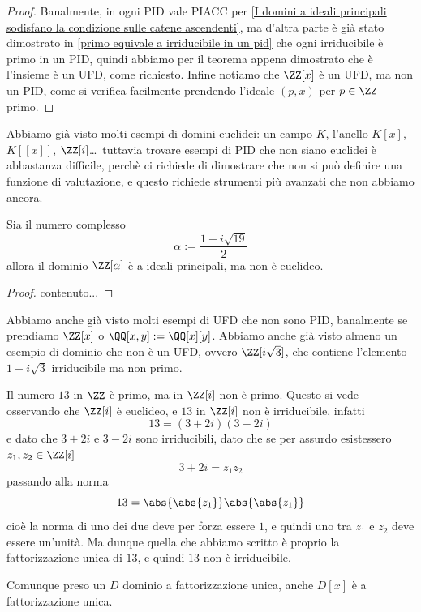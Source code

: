 \documentclass[11pt]{scrartcl}
\begin{document}
	\begin{proof}
		Banalmente, in ogni PID vale PIACC per \ref{I domini a ideali principali sodisfano la condizione sulle catene ascendenti}, ma d'altra parte è già stato dimostrato in \ref{primo equivale a irriducibile in un pid} che ogni irriducibile è primo in un PID, quindi abbiamo per il teorema appena dimostrato che è l'insieme è un UFD, come richiesto. Infine notiamo che $\ZZ[x]$ è un UFD, ma non un PID, come si verifica facilmente prendendo l'ideale $(p,x)$ per $p\in \ZZ$ primo.
	\end{proof}
	Abbiamo già visto molti esempi di domini euclidei: un campo $K$, l'anello $K[x]$, $K[[x]]$, $\ZZ[i]$\dots\, tuttavia trovare esempi di PID che non siano euclidei è abbastanza difficile, perchè ci richiede di dimostrare che non si può definire una funzione di valutazione, e questo richiede strumenti più avanzati che non abbiamo ancora. 
	\begin{example}
		Sia il numero complesso
		$$\alpha:=\frac{1+i\sqrt{19}}{2}$$
		allora il dominio $\ZZ[\alpha]$ è a ideali principali, ma non è euclideo. 
	\end{example}
	\begin{proof}
		contenuto...
	\end{proof}
	Abbiamo anche già visto molti esempi di UFD che non sono PID, banalmente se prendiamo $\ZZ[x]$ o $\QQ[x,y]:=\QQ[x][y]$. Abbiamo anche già visto almeno un esempio di dominio che non è un UFD, ovvero $\ZZ[i\sqrt{3}]$, che contiene l'elemento $1+i\sqrt{3}$ irriducibile ma non primo. 
	\begin{example}
		Il numero $13$ in $\ZZ$ è primo, ma in $\ZZ[i]$ non è primo. Questo si vede osservando che $\ZZ[i]$ è euclideo, e $13$ in $\ZZ[i]$ non è irriducibile, infatti
		$$13=(3+2i)(3-2i)$$
		e dato che $3+2i$ e $3-2i$ sono irriducibili, dato che se per assurdo esistessero $z_1,z_2\in \ZZ[i]$ 
		$$3+2i=z_1z_2$$
		passando alla norma
		$$13=\abs{\abs{z_1}}\abs{\abs{z_1}}$$
		cioè la norma di uno dei due deve per forza essere $1$, e quindi uno tra $z_1$ e $z_2$ deve essere un'unità. Ma dunque quella che abbiamo scritto è proprio la fattorizzazione unica di $13$, e quindi $13$ non è irriducibile.
	\end{example}
	\begin{lemma}
		Comunque preso un $D$ dominio a fattorizzazione unica, anche $D[x]$ è a fattorizzazione unica.
	\end{lemma}
	
\end{document}
